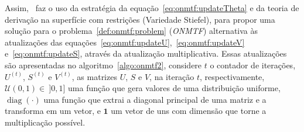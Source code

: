 \documentclass[
    12pt,                %
    oneside,            %
    a4paper,            %
    english,            %
    brazil                %
    ]{abntex2ppgsi}
\DeclareMathOperator*{\diag}{diag}
\begin{document}






Assim,~ faz o uso da estratégia da equação~\ref{eq:onmtf:updateTheta} e da teoria de derivação na superfície com restrições (Variedade Stiefel), para propor uma solução para o problema~\ref{def:onmtf:problem} (\textit{ONMTF}) alternativa às atualizações das equações~\ref{eq:onmtf:updateU},~\ref{eq:onmtf:updateV} e~\ref{eq:onmtf:updateS}, através da atualização multiplicativa.
Essas atualizações são apresentadas no algoritmo~\ref{algo:onmtf2}, considere $t$ o contador de iterações, $U^{(t)}$, $S^{(t)}$ e $V^{(t)}$, as matrizes $U$, $S$ e $V$, na iteração $t$, respectivamente, $\mathcal{U}(0, 1) \in~]0, 1]$ uma função que gera valores de uma distribuição uniforme, $\diag( \cdot )$ uma função que extrai a diagonal principal de uma matriz e a transforma em um vetor, e $\mathbf{1}$ um vetor de uns com dimensão que torne a multiplicação possível.
\end{document}
